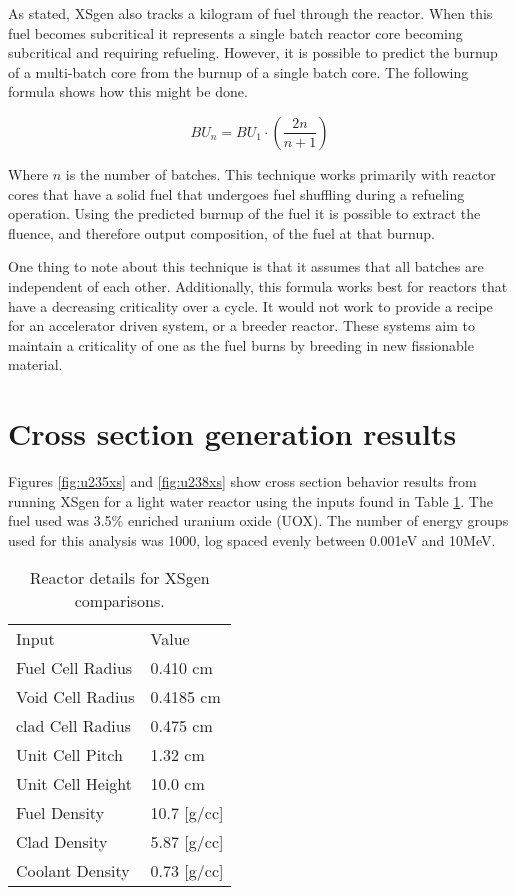 \documentclass{article}
\begin{document}
As stated, XSgen also tracks a kilogram of fuel through the reactor. When this fuel becomes subcritical it represents a single batch reactor core becoming subcritical and requiring refueling. However, it is possible to predict the burnup of a multi-batch core from the burnup of a single batch core. The following formula shows how this might be done.

\[  BU_n = BU_1 \cdot (\frac{2n}{n+1}) \tag{6} \label{eq6} \]

Where $n$ is the number of batches. This technique works primarily with reactor cores that have a solid fuel that undergoes fuel shuffling during a refueling operation. Using the predicted burnup of the fuel it is possible to extract the fluence, and therefore output composition, of the fuel at that burnup.

One thing to note about this technique is that it assumes that all batches are independent of each other. Additionally, this formula works best for reactors that have a decreasing criticality over a cycle. It would not work to provide a recipe for an accelerator driven system, or a breeder reactor. These systems aim to maintain a criticality of one as the fuel burns by breeding in new fissionable material.

\section{Cross section generation results}
Figures \ref{fig:u235xs} and \ref{fig:u238xs} show cross section behavior results from running XSgen for a light water reactor using the inputs found in Table \ref{tab:xsgenstats1}. The fuel used was 3.5\% enriched uranium oxide (UOX). The number of energy groups used for this analysis was 1000, log spaced evenly between 0.001eV and 10MeV.

\begin{table}[!htb]
\centering
\caption{Reactor details for XSgen comparisons.}
\label{tab:xsgenstats1}
\begin{tabular}{ll}
Input & Value \\
Fuel Cell Radius & 0.410 cm \\
Void Cell Radius & 0.4185 cm \\
clad Cell Radius & 0.475 cm \\
Unit Cell Pitch  & 1.32 cm \\
Unit Cell Height & 10.0 cm \\
Fuel Density & 10.7 [g/cc] \\
Clad Density & 5.87 [g/cc] \\
Coolant Density & 0.73 [g/cc]
\end{tabular}
\end{table}
\end{document}
